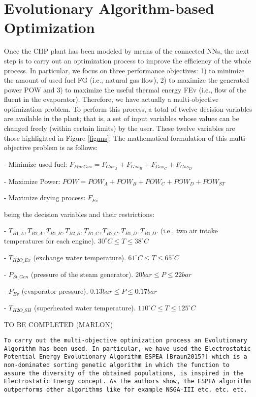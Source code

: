 \section{Evolutionary Algorithm-based Optimization}
\label{sec:optimization}
Once the CHP plant has been modeled by means of the connected NNs, the next step is to  carry out an optimization process to improve the efficiency of the whole process. In particular, we focus on three performance objectives: 1) to minimize the amount of used fuel FG (i.e., natural gas flow), 2) to maximize the generated power POW and 3) to maximize the useful thermal energy FEv (i.e., flow of the fluent in the evaporator). Therefore, we have actually a multi-objective optimization problem. To perform this process, a total of twelve decision variables  are available in the plant; that is, a set of input variables whose values can be changed freely (within certain limits) by the user. These twelve variables are those highlighted in  Figure  \ref{fignns}. The mathematical formulation of this multi-objective problem is as follows:

\bigskip -	Minimize used fuel:		$F_{FlueGas} = F_{Gas_A} + F_{Gas_B} + F_{Gas_C} + F_{Gas_D}$
\par -	Maximize Power:		$POW = POW_A + POW_B + POW_C + POW_D + POW_{ST}$
\par -	Maximize drying process: 	$F_{Ev}$

\bigskip
\noindent being the decision variables and their restrictions:
\bigskip

\par - $T_{B1\_A}, T_{B2\_A}, T_{B1\_B}, T_{B2\_B}, T_{B1\_C}, T_{B2\_C}, T_{B1\_D}, T_{B1\_D}$. (i.e., two air intake temperatures for each engine). $30^{\circ}C \leq T  \leq  38^{\circ}C$
\par -	$T_{H2O\_Ex}$ (exchange water temperature). $61^{\circ}C  \leq T  \leq  65^{\circ}C$
\par -	$P_{St\_Gen}$ (pressure of the steam generator). $20bar  \leq  P  \leq  22bar$
\par -	$P_{Ev}$ (evaporator pressure). $0.13bar  \leq  P  \leq  0.17bar$
\par -	$T_{H2O\_SH}$ (superheated water temperature). $110^{\circ}C  \leq  T  \leq  125^{\circ}C$
\bigskip

TO BE COMPLETED (MARLON)

{\tt To carry out the multi-objective optimization process an Evolutionary Algorithm has been used. In particular, we have used the Electrostatic Potential Energy Evolutionary Algorithm ESPEA [Braun2015?] which is a non-dominated sorting genetic algorithm in which the function to assure the diversity of the obtained populations, is inspired in the Electrostatic Energy concept. As the authors show, the ESPEA algorithm outperforms other algorithms like for example NSGA-III etc. etc. etc. }

